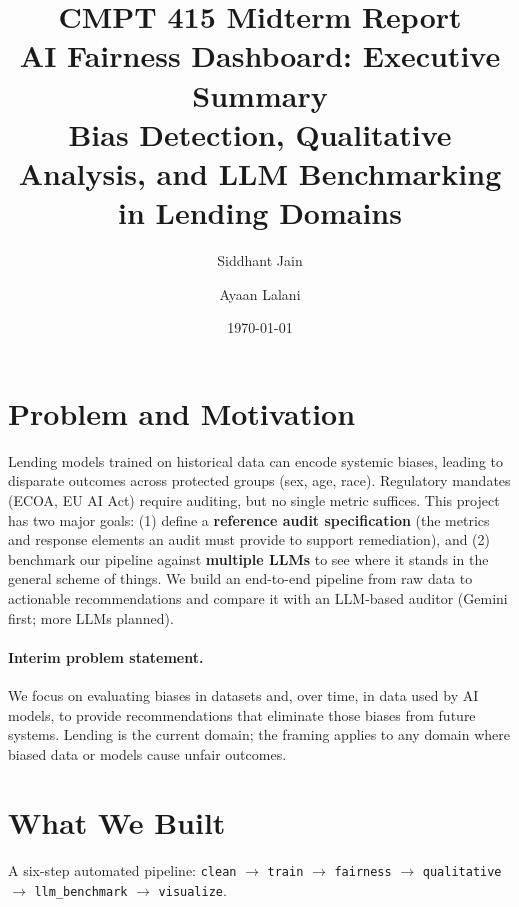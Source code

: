 \documentclass[11pt,a4paper]{article}
\title{%
  \textbf{CMPT 415 Midterm Report}\\[4pt]
  \Large AI Fairness Dashboard: Executive Summary\\[2pt]
  \normalsize Bias Detection, Qualitative Analysis, and LLM Benchmarking in Lending Domains
}
\author{Siddhant Jain \and Ayaan Lalani}
\date{\today}
\begin{document}
\maketitle
\thispagestyle{plain}

\section*{Problem and Motivation}

Lending models trained on historical data can encode systemic biases, leading to
disparate outcomes across protected groups (sex, age, race). Regulatory mandates
(ECOA, EU AI Act) require auditing, but no single metric suffices. This project
has two major goals: (1) define a \textbf{reference audit specification} (the
metrics and response elements an audit must provide to support remediation), and
(2) benchmark our pipeline against \textbf{multiple LLMs} to see where it stands
in the general scheme of things. We build an end-to-end pipeline from raw data
to actionable recommendations and compare it with an LLM-based auditor (Gemini
first; more LLMs planned).

\paragraph{Interim problem statement.}
We focus on evaluating biases in datasets and, over time, in data used by AI
models, to provide recommendations that eliminate those biases from future
systems. Lending is the current domain; the framing applies to any domain where
biased data or models cause unfair outcomes.

\section*{What We Built}

A six-step automated pipeline:
\texttt{clean} $\to$ \texttt{train} $\to$ \texttt{fairness} $\to$
\texttt{qualitative} $\to$ \texttt{llm\_benchmark} $\to$ \texttt{visualize}.
\end{document}
